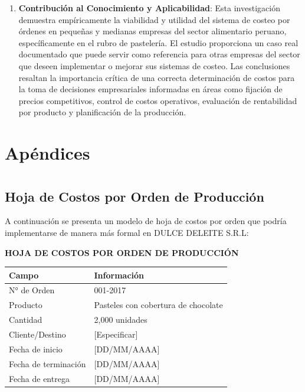 \documentclass[
  stu,
  floatsintext,
  longtable,
  a4paper,
  nolmodern,
  notxfonts,
  notimes,
  12pt,
  colorlinks=true,linkcolor=blue,citecolor=blue,urlcolor=blue]{apa7}
\newcounter{none} %
\begin{document}
\begin{enumerate}
  desperdicios.
\item
  \textbf{Contribución al Conocimiento y Aplicabilidad}: Esta
  investigación demuestra empíricamente la viabilidad y utilidad del
  sistema de costeo por órdenes en pequeñas y medianas empresas del
  sector alimentario peruano, específicamente en el rubro de pastelería.
  El estudio proporciona un caso real documentado que puede servir como
  referencia para otras empresas del sector que deseen implementar o
  mejorar sus sistemas de costeo. Las conclusiones resaltan la
  importancia crítica de una correcta determinación de costos para la
  toma de decisiones empresariales informadas en áreas como fijación de
  precios competitivos, control de costos operativos, evaluación de
  rentabilidad por producto y planificación de la producción.
\end{enumerate}

\appendix

\section{Apéndices}\label{apx-apuxe9ndices}

\section{}\label{}

\subsection{Hoja de Costos por Orden de
Producción}\label{apx-hoja-costos}

A continuación se presenta un modelo de hoja de costos por orden que
podría implementarse de manera más formal en DULCE DELEITE S.R.L:

\textbf{HOJA DE COSTOS POR ORDEN DE PRODUCCIÓN}

{\def\LTcaptype{none} %
\begin{longtable}[]{@{}ll@{}}
\toprule\noalign{}
Campo & Información \\
\midrule\noalign{}
\endhead
\bottomrule\noalign{}
\endlastfoot
N° de Orden & 001-2017 \\
Producto & Pasteles con cobertura de chocolate \\
Cantidad & 2,000 unidades \\
Cliente/Destino & {[}Especificar{]} \\
Fecha de inicio & {[}DD/MM/AAAA{]} \\
Fecha de terminación & {[}DD/MM/AAAA{]} \\
Fecha de entrega & {[}DD/MM/AAAA{]} \\
\end{longtable}
}
\end{document}

